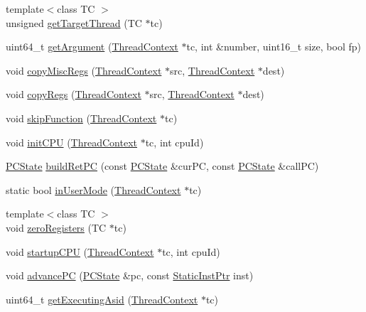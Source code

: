 \begin{DoxyCompactItemize}
\item 
{\footnotesize template$<$class TC $>$ }\\unsigned \hyperlink{namespaceSparcISA_a4ea507861bd4ae5fdd7f3e99f20f8333}{getTargetThread} (TC $\ast$tc)
\item 
uint64\_\-t \hyperlink{namespaceSparcISA_a3f9560369e934be05b1dd8f23fbd6104}{getArgument} (\hyperlink{classThreadContext}{ThreadContext} $\ast$tc, int \&number, uint16\_\-t size, bool fp)
\item 
void \hyperlink{namespaceSparcISA_a42833096094e5ff0f2de948bf8e5965c}{copyMiscRegs} (\hyperlink{classThreadContext}{ThreadContext} $\ast$src, \hyperlink{classThreadContext}{ThreadContext} $\ast$dest)
\item 
void \hyperlink{namespaceSparcISA_aaeffcccf262b0dbd3cbcc8b4cef41168}{copyRegs} (\hyperlink{classThreadContext}{ThreadContext} $\ast$src, \hyperlink{classThreadContext}{ThreadContext} $\ast$dest)
\item 
void \hyperlink{namespaceSparcISA_a2624d7d8bac3eb03de2eb6e83903c208}{skipFunction} (\hyperlink{classThreadContext}{ThreadContext} $\ast$tc)
\item 
void \hyperlink{namespaceSparcISA_aded557a1e716c6f849b0e0b05fc77676}{initCPU} (\hyperlink{classThreadContext}{ThreadContext} $\ast$tc, int cpuId)
\item 
\hyperlink{classGenericISA_1_1DelaySlotUPCState}{PCState} \hyperlink{namespaceSparcISA_a78daadca16f296fa73d02e493f19ba4a}{buildRetPC} (const \hyperlink{classGenericISA_1_1DelaySlotUPCState}{PCState} \&curPC, const \hyperlink{classGenericISA_1_1DelaySlotUPCState}{PCState} \&callPC)
\item 
static bool \hyperlink{namespaceSparcISA_accf04e5f1db51bd27beab2f091d4e999}{inUserMode} (\hyperlink{classThreadContext}{ThreadContext} $\ast$tc)
\item 
{\footnotesize template$<$class TC $>$ }\\void \hyperlink{namespaceSparcISA_a97e4061eeb8177ba68cd308488877c2c}{zeroRegisters} (TC $\ast$tc)
\item 
void \hyperlink{namespaceSparcISA_a2f2a8ef3b49a1c14f0ee1e3f902528ec}{startupCPU} (\hyperlink{classThreadContext}{ThreadContext} $\ast$tc, int cpuId)
\item 
void \hyperlink{namespaceSparcISA_acb3999b0d01cc0f4d8bb909b234dfa96}{advancePC} (\hyperlink{classGenericISA_1_1DelaySlotUPCState}{PCState} \&pc, const \hyperlink{classRefCountingPtr}{StaticInstPtr} inst)
\item 
uint64\_\-t \hyperlink{namespaceSparcISA_a01ed5c632599d5d874461f3251873236}{getExecutingAsid} (\hyperlink{classThreadContext}{ThreadContext} $\ast$tc)

\end{DoxyCompactItemize}
